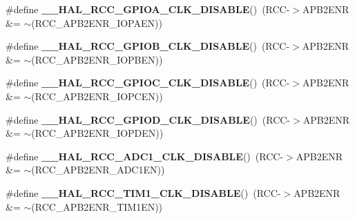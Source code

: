 \begin{DoxyCompactItemize}
\item 
\mbox{\label{group___r_c_c___a_p_b2___clock___enable___disable_ga7083e491e6a1e165d064d199304bd2f0}} 
\#define {\bfseries \+\_\+\+\_\+\+H\+A\+L\+\_\+\+R\+C\+C\+\_\+\+G\+P\+I\+O\+A\+\_\+\+C\+L\+K\+\_\+\+D\+I\+S\+A\+B\+LE}()~(R\+CC-\/$>$A\+P\+B2\+E\+NR \&= $\sim$(R\+C\+C\+\_\+\+A\+P\+B2\+E\+N\+R\+\_\+\+I\+O\+P\+A\+EN))
\item 
\mbox{\label{group___r_c_c___a_p_b2___clock___enable___disable_ga60be1be419b57dafbbb93df67d68a424}} 
\#define {\bfseries \+\_\+\+\_\+\+H\+A\+L\+\_\+\+R\+C\+C\+\_\+\+G\+P\+I\+O\+B\+\_\+\+C\+L\+K\+\_\+\+D\+I\+S\+A\+B\+LE}()~(R\+CC-\/$>$A\+P\+B2\+E\+NR \&= $\sim$(R\+C\+C\+\_\+\+A\+P\+B2\+E\+N\+R\+\_\+\+I\+O\+P\+B\+EN))
\item 
\mbox{\label{group___r_c_c___a_p_b2___clock___enable___disable_ga0fc90c25d35f9b5b5f66961505de1cd4}} 
\#define {\bfseries \+\_\+\+\_\+\+H\+A\+L\+\_\+\+R\+C\+C\+\_\+\+G\+P\+I\+O\+C\+\_\+\+C\+L\+K\+\_\+\+D\+I\+S\+A\+B\+LE}()~(R\+CC-\/$>$A\+P\+B2\+E\+NR \&= $\sim$(R\+C\+C\+\_\+\+A\+P\+B2\+E\+N\+R\+\_\+\+I\+O\+P\+C\+EN))
\item 
\mbox{\label{group___r_c_c___a_p_b2___clock___enable___disable_gaeaefe364dafdc0c22353969595421422}} 
\#define {\bfseries \+\_\+\+\_\+\+H\+A\+L\+\_\+\+R\+C\+C\+\_\+\+G\+P\+I\+O\+D\+\_\+\+C\+L\+K\+\_\+\+D\+I\+S\+A\+B\+LE}()~(R\+CC-\/$>$A\+P\+B2\+E\+NR \&= $\sim$(R\+C\+C\+\_\+\+A\+P\+B2\+E\+N\+R\+\_\+\+I\+O\+P\+D\+EN))
\item 
\mbox{\label{group___r_c_c___a_p_b2___clock___enable___disable_ga80a9e4852bac07d3d9cc6390a361302a}} 
\#define {\bfseries \+\_\+\+\_\+\+H\+A\+L\+\_\+\+R\+C\+C\+\_\+\+A\+D\+C1\+\_\+\+C\+L\+K\+\_\+\+D\+I\+S\+A\+B\+LE}()~(R\+CC-\/$>$A\+P\+B2\+E\+NR \&= $\sim$(R\+C\+C\+\_\+\+A\+P\+B2\+E\+N\+R\+\_\+\+A\+D\+C1\+EN))
\item 
\mbox{\label{group___r_c_c___a_p_b2___clock___enable___disable_gaa9eacfb8ee244074ec63dae0b9f621c2}} 
\#define {\bfseries \+\_\+\+\_\+\+H\+A\+L\+\_\+\+R\+C\+C\+\_\+\+T\+I\+M1\+\_\+\+C\+L\+K\+\_\+\+D\+I\+S\+A\+B\+LE}()~(R\+CC-\/$>$A\+P\+B2\+E\+NR \&= $\sim$(R\+C\+C\+\_\+\+A\+P\+B2\+E\+N\+R\+\_\+\+T\+I\+M1\+EN))

\end{DoxyCompactItemize}
